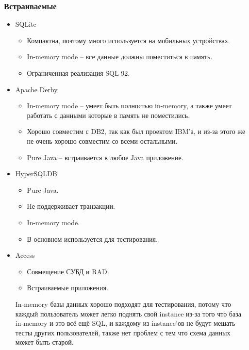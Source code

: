 \subsubsection{Встраиваемые}
\begin{itemize}
	\item SQLite
	      \begin{itemize}
		      \item Компактна, поэтому много используется на мобильных устройствах.
		      \item In-memory mode -- все данные должны поместиться в память.
		      \item Ограниченная реализация SQL-92.
	      \end{itemize}
	\item Apache Derby
	      \begin{itemize}
		      \item In-memory mode -- умеет быть полностью in-memory, а также умеет работать с данными которые в память
		            не поместились.
		      \item Хорошо совместим с DB2, так как был проектом IBM'а, и из-за этого же не очень хорошо совместим со
		            всеми остальными.
		      \item Pure Java -- встраивается в любое Java приложение.
	      \end{itemize}
	\item HyperSQLDB
	      \begin{itemize}
		      \item Pure Java.
		      \item Не поддерживает транзакции.
		      \item In-memory mode.
		      \item В основном используется для тестирования.
	      \end{itemize}
	\item Access
	      \begin{itemize}
		      \item Совмещение СУБД и RAD.
		      \item Встраиваемые приложения.
	      \end{itemize}
	      \begin{remark}
		      In-memory базы данных хорошо подходят для тестирования, потому что каждый пользователь может легко
		      поднять свой instance из-за того что база in-memory и это всё ещё SQL, и каждому из instance'ов не
		      будут мешать тесты других пользователей, также нет проблем с тем что схема данных может быть
		      старой.
	      \end{remark}
\end{itemize}

